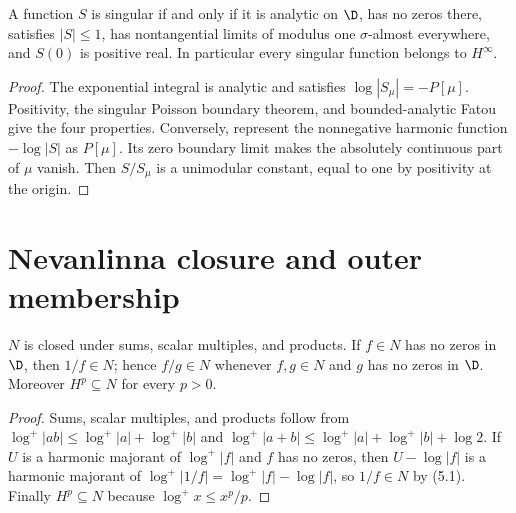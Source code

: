 \begin{theorem}
  \label{thm:singular_function_characterization}
  \leanok
  A function $S$ is singular if and only if it is analytic on $\D$,
  has no zeros there, satisfies $|S|\le1$, has nontangential limits of
  modulus one $\sigma$-almost everywhere, and $S(0)$ is positive real. In
  particular every singular function belongs to $H^\infty$.
  \begin{proof}
    \notready
    The exponential integral is analytic and satisfies
    $\log|S_\mu|=-P[\mu]$. Positivity, the singular Poisson boundary theorem,
    and bounded-analytic Fatou give the four properties.
    Conversely, represent the nonnegative harmonic function $-\log|S|$
    as $P[\mu]$. Its zero boundary limit makes the absolutely continuous
    part of $\mu$ vanish. Then $S/S_\mu$ is a unimodular constant,
    equal to one by positivity at the origin.
  \end{proof}
\end{theorem}

\section{Nevanlinna closure and outer membership}

\begin{theorem}
  \label{thm:nevanlinna_algebra}
  \leanok
  $N$ is closed under sums, scalar multiples, and products. If $f\in N$ has no
  zeros in $\D$, then $1/f\in N$; hence $f/g\in N$ whenever $f,g\in N$ and $g$
  has no zeros in $\D$. Moreover $H^p\subseteq N$ for every $p>0$.
  \begin{proof}
    \leanok
    Sums, scalar multiples, and products follow from
    $\log^+|ab|\le\log^+|a|+\log^+|b|$ and
    $\log^+|a+b|\le\log^+|a|+\log^+|b|+\log2$. If $U$ is a harmonic majorant
    of $\log^+|f|$ and $f$ has no zeros, then $U-\log|f|$ is a harmonic
    majorant of $\log^+|1/f|=\log^+|f|-\log|f|$, so $1/f\in N$ by (5.1).
    Finally $H^p\subseteq N$ because $\log^+x\le x^p/p$.
  \end{proof}
\end{theorem}

